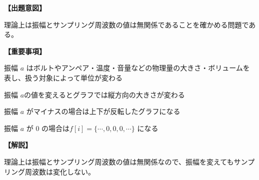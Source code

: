 \noindent \textbf{【出題意図】}

\noindent 理論上は振幅とサンプリング周波数の値は無関係であることを確かめる問題である。

\vspace{1em}
\noindent \textbf{【重要事項】}

\bigskip
\noindent\quad 振幅 $a$ はボルトやアンペア・温度・音量などの物理量の大きさ・ボリュームを表し、扱う対象によって単位が変わる

\bigskip
\noindent\quad 振幅 $a$の値を変えるとグラフでは縦方向の大きさが変わる

\bigskip
\noindent\quad 振幅 $a$ がマイナスの場合は上下が反転したグラフになる

\bigskip
\noindent\quad 振幅 $a$ が $0$ の場合は$f[i]=\{\cdots,0,0,0,\cdots\}$ になる


\vspace{1em}
\noindent \textbf{【解説】}

\noindent 理論上は振幅とサンプリング周波数の値は無関係なので、振幅を変えてもサンプリング周波数は変化しない。
